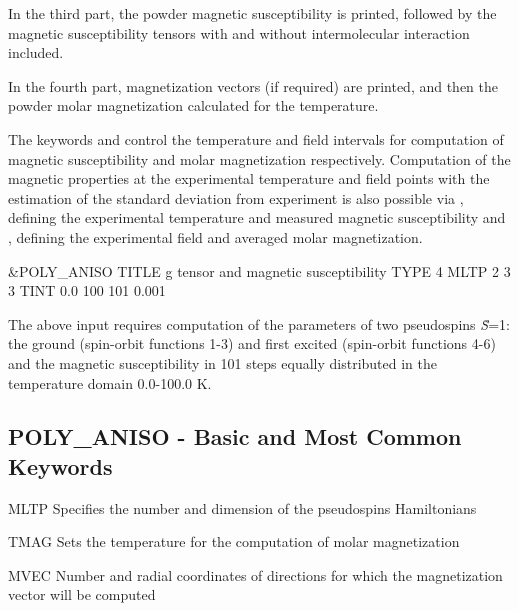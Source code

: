 In the third part, the powder magnetic susceptibility is printed, followed by the magnetic susceptibility tensors with and without intermolecular interaction included.

In the fourth part, magnetization vectors (if required) are printed, and then the powder molar magnetization calculated for the 
temperature.

The keywords  and  control the temperature and field intervals for computation of
magnetic susceptibility and molar magnetization respectively.
Computation of the magnetic properties at the experimental temperature and field points with the estimation of the standard deviation from experiment
is also possible via , defining the experimental temperature and measured magnetic susceptibility and
, defining the experimental field and averaged molar magnetization.

\begin{inputlisting}
 &POLY_ANISO
 TITLE
 g tensor and magnetic susceptibility
 TYPE
 4
 MLTP
 2
 3 3
 TINT
 0.0 100 101 0.001
\end{inputlisting}

The above input requires computation of the parameters of two pseudospins \textit{\~{S}}=1: the ground (spin-orbit functions 1-3)
and first excited (spin-orbit functions 4-6) and the magnetic susceptibility in 101 steps equally distributed in
the temperature domain 0.0-100.0 K.

\subsection{POLY\_ANISO - Basic and Most Common Keywords}
\begin{keywordlist}
\item[MLTP] Specifies the number and dimension of the pseudospins Hamiltonians
\item[TMAG] Sets the temperature for the computation of molar magnetization
\item[MVEC] Number and radial coordinates of directions for which the magnetization vector will be computed
\end{keywordlist}

